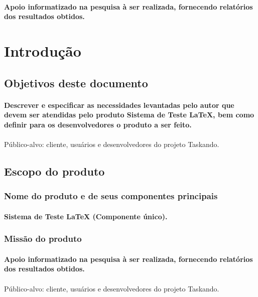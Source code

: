 \documentclass{article}
\begin{document}
			\paragraph{Apoio informatizado na pesquisa à ser realizada, fornecendo relatórios dos resultados obtidos.}
			
\newpage

\section{Introdução}
	\subsection{Objetivos deste documento}
		\paragraph{Descrever e especificar as necessidades levantadas pelo autor que devem ser atendidas pelo produto Sistema de Teste LaTeX, bem como definir para os desenvolvedores o produto a ser feito.}
\paragraph{}Público-alvo: cliente, usuários e desenvolvedores do projeto Taskando.
	\subsection{Escopo do produto}
		\subsubsection{Nome do produto e de seus componentes principais}
			\paragraph{Sistema de Teste LaTeX (Componente único). }
		\subsubsection{Missão do produto}
			\paragraph{Apoio informatizado na pesquisa à ser realizada, fornecendo relatórios dos resultados obtidos.}
			\paragraph{}Público-alvo: cliente, usuários e desenvolvedores do projeto Taskando.
\end{document}
